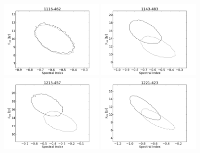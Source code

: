 \documentclass[preprint]{aastex}
\begin{document}
\begin{figure}[htbp]
\begin{center}
\includegraphics[width=2in]{plots/1116-462_SI_MCMC.png} %
\includegraphics[width=2in]{plots/1143-483_SI_MCMC.png} %
\includegraphics[width=2in]{plots/1215-457_SI_MCMC.png} %
\includegraphics[width=2in]{plots/1221-423_SI_MCMC.png} %

\end{center}
\end{figure}
\end{document}
